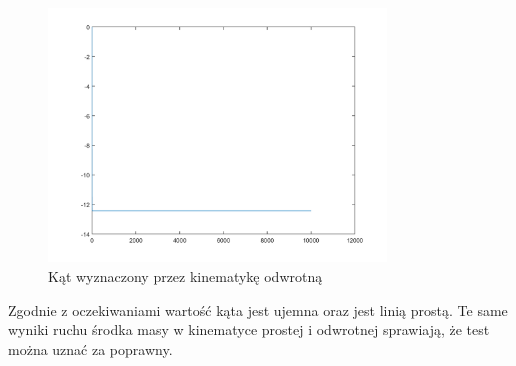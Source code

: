 \documentclass[a4paper, 12pt]{report}
\begin{document}
				\begin{figure}[H]
					\centering
					\includegraphics[width = 0.8\textwidth]{./AP/img/rev/right_circle_in_3.png}
					\caption{Kąt wyznaczony przez kinematykę odwrotną}
				\end{figure}
				\noindent Zgodnie z oczekiwaniami wartość kąta jest ujemna oraz jest linią prostą. Te same wyniki ruchu środka masy w kinematyce prostej i odwrotnej sprawiają, że test można uznać za poprawny.
			\newpage
\end{document}

